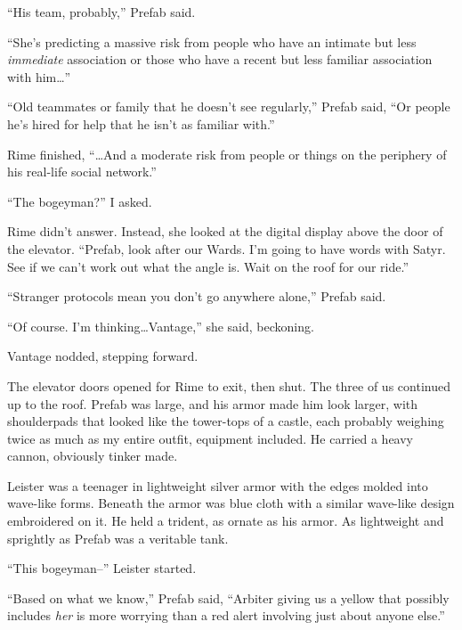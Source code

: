 ``His team, probably,'' Prefab said.



``She's predicting a massive risk from people who have an intimate but less \emph{immediate} association or those who have a recent but less familiar association with him\ldots''



``Old teammates or family that he doesn't see regularly,'' Prefab said, ``Or people he's hired for help that he isn't as familiar with.''



Rime finished, ``\ldots{}And a moderate risk from people or things on the periphery of his real-life social network.''



``The bogeyman?'' I asked.



Rime didn't answer.  Instead, she looked at the digital display above the door of the elevator.  ``Prefab, look after our Wards.  I'm going to have words with Satyr.  See if we can't work out what the angle is.  Wait on the roof for our ride.''



``Stranger protocols mean you don't go anywhere alone,'' Prefab said.



``Of course.  I'm thinking\ldots  Vantage,'' she said, beckoning.



Vantage nodded, stepping forward.



The elevator doors opened for Rime to exit, then shut.  The three of us continued up to the roof.  Prefab was large, and his armor made him look larger, with shoulderpads that looked like the tower-tops of a castle, each probably weighing twice as much as my entire outfit, equipment included.  He carried a heavy cannon, obviously tinker made.



Leister was a teenager in lightweight silver armor with the edges molded into wave-like forms.  Beneath the armor was blue cloth with a similar wave-like design embroidered on it.  He held a trident, as ornate as his armor.  As lightweight and sprightly as Prefab was a veritable tank.



``This bogeyman--'' Leister started.



``Based on what we know,'' Prefab said, ``Arbiter giving us a yellow that possibly includes \emph{her} is more worrying than a red alert involving just about anyone else.''



